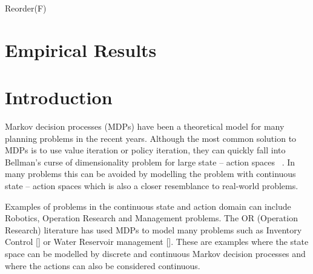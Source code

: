 \documentclass[letterpaper]{article}
\begin{document}
\incmargin{1em}
\begin{algorithm}[t!]

\BlankLine
{}
\caption{{\sc Reorder}(F)  \label{fig:correct}}
\end{algorithm}
\decmargin{1em}


\section{Empirical Results}

\newpage

\section{Introduction}


Markov decision processes (MDPs) have been a theoretical model for many planning problems in the recent years. Although the most common solution to MDPs is to use value iteration or policy iteration, they can quickly fall into Bellman's curse of dimensionality problem for large state – action spaces ~\cite{puterman}. In many problems this can be avoided by modelling the problem with continuous state – action spaces which is also a closer resemblance to real-world problems. 

Examples of problems in the continuous state and action domain can include Robotics, Operation Research and Management problems. The OR (Operation Research) literature has used MDPs to model many problems such as Inventory Control [] or Water Reservoir management []. These are examples where the state space can be modelled by discrete and continuous Markov decision processes and where the actions can also be considered continuous.
\end{document}
